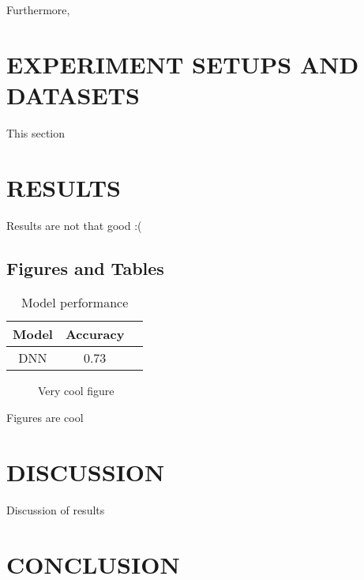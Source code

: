 \documentclass[letterpaper, 10 pt, conference]{ieeeconf}  %
\begin{document}
Furthermore, 


\section{EXPERIMENT SETUPS AND DATASETS}

This section

\section{RESULTS}

Results are not that good :(

\subsection{Figures and Tables}

\begin{table}[h]
\caption{Model performance}
\label{table_example}
\begin{center}
\begin{tabular}{|c|c|c|}
\hline
Model & Accuracy\\
\hline
DNN & 0.73\\
\hline
\end{tabular}
\end{center}
\end{table}


   \begin{figure}[thpb]
      \centering
      \caption{Very cool figure}
      \label{figurelabel}
   \end{figure}
   

Figures are cool

\section{DISCUSSION}

Discussion of results 

\section{CONCLUSION}

\addtolength{\textheight}{-12cm}   %
\end{document}
